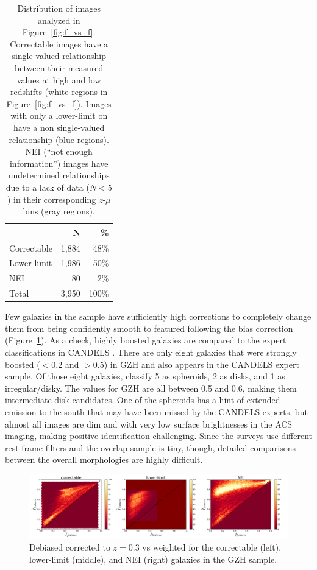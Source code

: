 \documentclass[twocolumn]{aastex6}
\begin{document}
\begin{table}
\center
\caption{Distribution of \ferengi{} images analyzed in Figure~\ref{fig:f_vs_f}.
Correctable images have a single-valued relationship between their measured
\ffeatures{} values at high and low redshifts (white regions in
Figure~\ref{fig:f_vs_f}). Images with only a lower-limit on \ffeatures{} have a
non single-valued relationship (blue regions). NEI (``not enough information'')
images have undetermined relationships due to a lack of data ($N<5$) in their
corresponding $z$-$\mu$ bins (gray regions).\label{tbl:ferengi_corrections}}
\begin{tabular}{lrr}
\hline \hline
				                   & N       & \% \\
\hline 
Correctable                        & 1,884   & 48\% \\
Lower-limit                        & 1,986   & 50\% \\
NEI                                & 80      &  2\%\\
Total                              & 3,950   & 100\% \\
\hline \hline
\end{tabular}
\end{table}

Few galaxies in the sample have sufficiently high corrections to completely
change them from being confidently smooth to featured following the bias
correction (Figure~\ref{fig:debiased_corrections}). As a check, highly boosted
galaxies are compared to the expert classifications in CANDELS \citep{kar15}.
There are only eight galaxies that were strongly boosted (\ffeatures$<0.2$ and
\fbest$>0.5$) in GZH and also appears in the CANDELS expert sample. Of those
eight galaxies, \citet{kar15} classify 5 as spheroids, 2 as disks, and 1 as
irregular/disky. The \fbest{} values for GZH are all between 0.5 and 0.6,
making them intermediate disk candidates. One of the spheroids has a hint of
extended emission to the south that may have been missed by the CANDELS
experts, but almost all images are dim and with very low surface brightnesses
in the ACS imaging, making positive identification challenging. Since the
surveys use different rest-frame filters and the overlap sample is tiny,
though, detailed comparisons between the overall morphologies are highly
difficult.

\begin{figure}
\center
\includegraphics[width=\textwidth]{figures/debiased_corrections.pdf}
\caption{Debiased \ffeatures{} corrected to $z=0.3$ vs weighted \ffeatures{}
for the correctable (left), lower-limit (middle), and NEI (right) galaxies in
    the GZH sample.}
\label{fig:debiased_corrections}
\end{figure}
\end{document}
